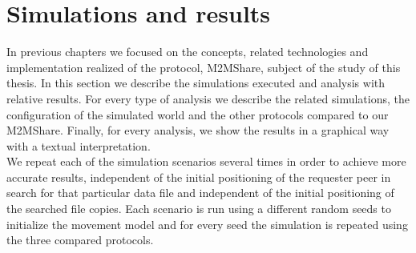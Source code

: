 
\chapter{Simulations and results}\label{simulazione} %





In previous chapters we focused on the concepts, related technologies and implementation realized of the protocol, M2MShare, subject of the study of this thesis. In this section we describe the simulations executed and analysis with relative results. For every type of analysis we describe the related simulations, the configuration of the simulated world and the other protocols compared to our M2MShare. Finally, for every analysis, we show the results in a graphical way with a textual interpretation.
\\

We repeat each of the simulation scenarios several times in order to achieve more accurate results, independent of the initial positioning of the requester peer in search for that particular data file and independent of the initial positioning of the searched file copies. Each scenario is run using a different random seeds to initialize the movement model and for every seed the simulation is repeated using the three compared protocols.


